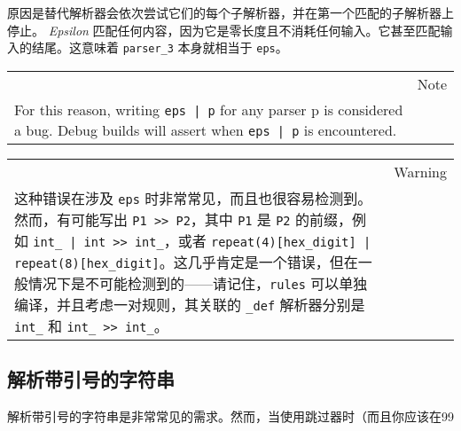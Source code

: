 原因是替代解析器会依次尝试它们的每个子解析器，并在第一个匹配的子解析器上停止。 \emph{Epsilon} 匹配任何内容，因为它是零长度且不消耗任何输入。它甚至匹配输入的结尾。这意味着 \texttt{parser\_3} 本身就相当于 \texttt{eps}。

\begin{longtable}[]{@{}
  >{\raggedright\arraybackslash}p{}
  >{\raggedright\arraybackslash}p{}@{}}
\toprule\noalign{}
\endhead
\bottomrule\noalign{}
\endlastfoot
\begin{minipage}[t]{\linewidth}\raggedright
\end{minipage} & Note \\
For this reason, writing \texttt{eps | p} for any parser p is considered a bug. Debug builds will assert when \texttt{eps | p} is encountered. & \\
\end{longtable}

\begin{longtable}[]{@{}
  >{\raggedright\arraybackslash}p{}
  >{\raggedright\arraybackslash}p{}@{}}
\toprule\noalign{}
\endhead
\bottomrule\noalign{}
\endlastfoot
\begin{minipage}[t]{\linewidth}\raggedright
\end{minipage} & Warning \\
这种错误在涉及 \texttt{eps} 时非常常见，而且也很容易检测到。然而，有可能写出 \texttt{P1 >> P2}，其中 \texttt{P1} 是 \texttt{P2} 的前缀，例如 \texttt{int\_ | int >> int\_}，或者 \texttt{repeat(4){[}hex\_digit{]} | repeat(8){[}hex\_digit{]}}。这几乎肯定是一个错误，但在一般情况下是不可能检测到的——请记住，\texttt{rules} 可以单独编译，并且考虑一对规则，其关联的 \texttt{\_def} 解析器分别是 \texttt{int\_} 和 \texttt{int\_ >> int\_}。 & \\
\end{longtable}

\subsection{解析带引号的字符串}

解析带引号的字符串是非常常见的需求。然而，当使用跳过器时（而且你应该在99%

